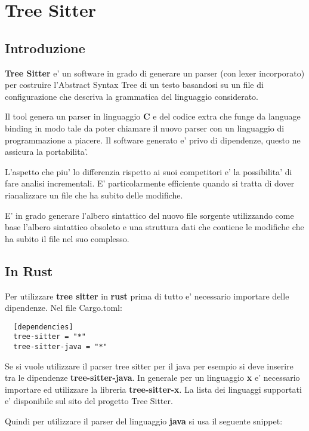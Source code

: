 \chapter{Tree Sitter}

\section{Introduzione}

\textbf{Tree Sitter} \cite{tree_sitter} e' un software in grado di generare un parser (con lexer incorporato) per costruire l'Abstract Syntax Tree di un testo basandosi su un file di configurazione che descriva la grammatica del linguaggio considerato.

Il tool genera un parser in linguaggio \textbf{C} e del codice extra che funge da language binding in modo tale da poter chiamare il nuovo parser con un linguaggio di programmazione a piacere.
Il software generato e' privo di dipendenze, questo ne assicura la portabilita'.

L'aspetto che piu' lo differenzia rispetto ai suoi competitori e' la possibilita' di fare analisi incrementali.
E' particolarmente efficiente quando si tratta di dover rianalizzare un file che ha subito delle modifiche.

E' in grado generare l'albero sintattico del nuovo file sorgente utilizzando come base l'albero sintattico obsoleto e una struttura dati che contiene le modifiche che ha subito il file nel suo complesso.

\section{In Rust}

Per utilizzare \textbf{tree sitter} in \textbf{rust} prima di tutto e' necessario importare delle dipendenze. Nel file Cargo.toml:

\begin{verbatim}
  [dependencies]
  tree-sitter = "*"
  tree-sitter-java = "*"
\end{verbatim}

Se si vuole utilizzare il parser tree sitter per il java per esempio si deve inserire tra le dipendenze \textbf{tree-sitter-java}.
In generale per un linguaggio \textbf{x} e' necessario importare ed utilizzare la libreria \textbf{tree-sitter-x}.
La lista dei linguaggi supportati e' disponibile sul sito del progetto Tree Sitter.

Quindi per utilizzare il parser del linguaggio \textbf{java} si usa il seguente snippet:

